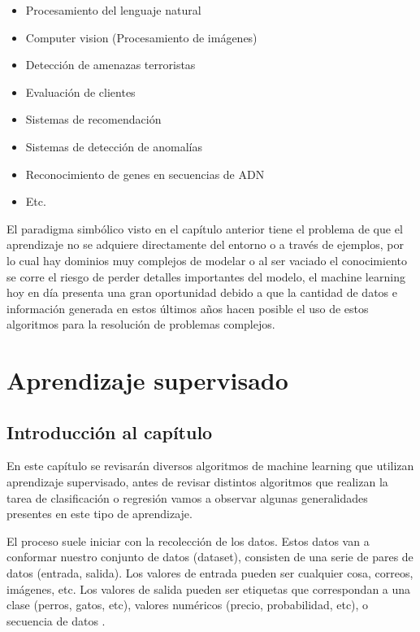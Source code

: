 \documentclass[11pt,fleqn]{book} %
\begin{document}
\begin{itemize}
\item Procesamiento del lenguaje natural
\item Computer vision (Procesamiento de imágenes)
\item Detección de amenazas terroristas
\item Evaluación de clientes
\item Sistemas de recomendación
\item Sistemas de detección de anomalías
\item Reconocimiento de genes en secuencias de ADN
\item Etc.
\end{itemize}

El paradigma simbólico visto en el capítulo anterior tiene el problema de que el aprendizaje no se adquiere directamente del entorno o a través de ejemplos, por lo cual hay dominios muy complejos de modelar o al ser vaciado el conocimiento se corre el riesgo de perder detalles importantes del modelo, el machine learning hoy en día presenta una gran oportunidad debido a que la cantidad de datos e información generada en estos últimos años hacen posible el uso de estos algoritmos para la resolución de problemas complejos.


\chapter{Aprendizaje supervisado}

\section{Introducción al capítulo} 

En este capítulo se revisarán diversos algoritmos de machine learning que utilizan aprendizaje supervisado, antes de revisar distintos algoritmos que realizan la tarea de clasificación o regresión vamos a observar algunas generalidades presentes en este tipo de aprendizaje.

El proceso suele iniciar con la recolección de los datos. Estos datos van a conformar nuestro conjunto de datos (dataset), consisten de una serie de pares de datos (entrada, salida). Los valores de entrada pueden ser cualquier cosa, correos, imágenes, etc. Los valores de salida pueden ser etiquetas que correspondan a una clase (perros, gatos, etc), valores numéricos (precio, probabilidad, etc), o secuencia de datos \cite{burkov2019hundred}.
\end{document}
